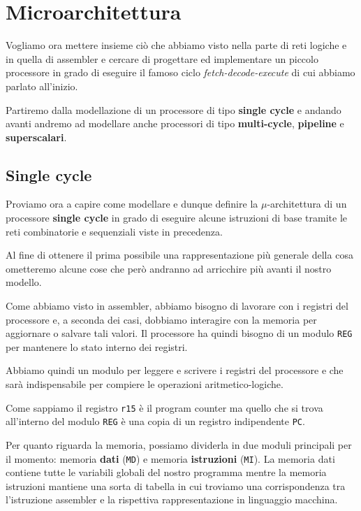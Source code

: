 \chapter{Microarchitettura}
Vogliamo ora mettere insieme ciò che abbiamo visto nella parte di reti logiche e in quella di
assembler e cercare di progettare ed implementare un piccolo processore in grado di eseguire
il famoso ciclo \emph{fetch-decode-execute} di cui abbiamo parlato all'inizio.

Partiremo dalla modellazione di un processore di tipo \textbf{single cycle} e andando avanti
andremo ad modellare anche processori di tipo \textbf{multi-cycle}, \textbf{pipeline} e
\textbf{superscalari}.

\section{Single cycle}
Proviamo ora a capire come modellare e dunque definire la $\mu$-architettura di un processore
\textbf{single cycle} in grado di eseguire alcune istruzioni di base tramite le reti combinatorie e
sequenziali viste in precedenza.

Al fine di ottenere il prima possibile una rappresentazione più generale della cosa ometteremo
alcune cose che però andranno ad arricchire più avanti il nostro modello.

Come abbiamo visto in assembler, abbiamo bisogno di lavorare con i registri del processore e, a
seconda dei casi, dobbiamo interagire con la memoria per aggiornare o salvare tali valori. Il
processore ha quindi bisogno di un modulo \verb|REG| per mantenere lo stato interno dei registri.
\begin{center}
	
\end{center}
Abbiamo quindi un modulo per leggere e scrivere i registri del processore e che sarà indispensabile
per compiere le operazioni aritmetico-logiche.

Come sappiamo il registro \verb|r15| è il program counter ma quello che si trova all'interno del
modulo \verb|REG| è una copia di un registro indipendente \verb|PC|.

Per quanto riguarda la memoria, possiamo dividerla in due moduli principali per il momento: memoria
\textbf{dati} (\verb|MD|) e memoria \textbf{istruzioni} (\verb|MI|). La memoria dati contiene tutte
le variabili globali del nostro programma mentre la memoria istruzioni mantiene una sorta di
tabella in cui troviamo una corrispondenza tra l'istruzione assembler e la rispettiva
rappresentazione in linguaggio macchina.

